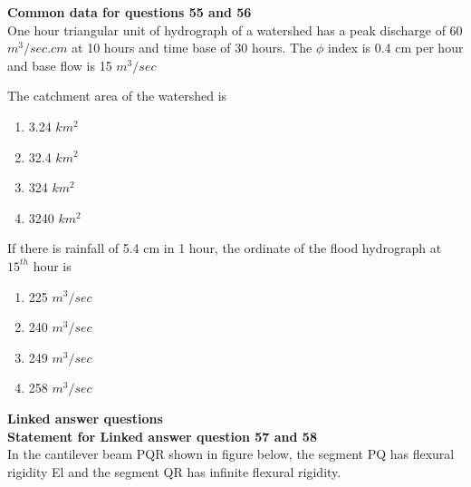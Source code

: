   \textbf{Common data for questions 55 and 56} \\
  One hour triangular unit of hydrograph of a watershed has a peak discharge of 60 $m^{3}/sec.cm$ at 10 hours and time base of 30 hours. The $\phi$ index is 0.4 cm per hour and base flow is 15 $m^{3}/sec$ 
  \item The catchment area of the watershed is 
  \begin{enumerate}
      \item 3.24 $km^{2}$
    \item 32.4 $km^{2}$
      \item 324 $km^{2}$
      \item 3240 $km^{2}$
  \end{enumerate}
  \item If there is rainfall of 5.4 cm in 1 hour, the ordinate of the flood hydrograph at $15^{th}$ hour is
  \begin{enumerate}
      \item 225 $m^{3}/sec$
      \item 240 $m^{3}/sec$
      \item 249 $m^{3}/sec$
      \item 258 $m^{3}/sec$ \\
  \end{enumerate}
  \textbf{Linked answer questions} \\
  \textbf{Statement for Linked answer question 57 and 58} \\
  In the cantilever beam PQR shown in figure below, the segment PQ has flexural rigidity El and the segment QR has infinite flexural rigidity.

